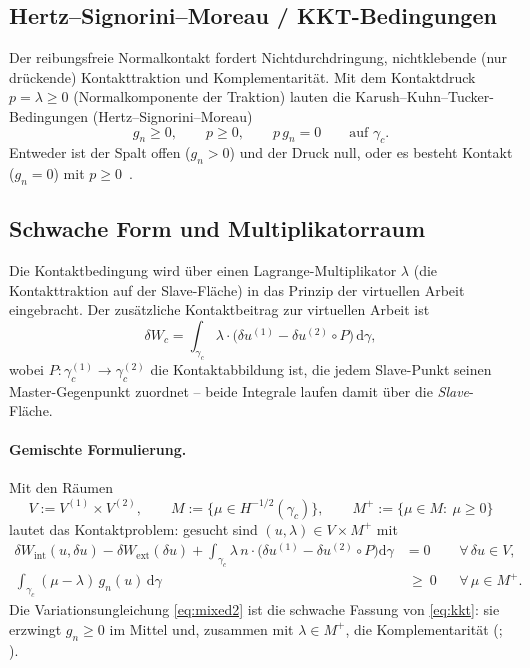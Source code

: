 \documentclass[a4paper,11pt]{article}
\def\bm#1{#1}%
\begin{document}
\subsection{Hertz--Signorini--Moreau / KKT-Bedingungen}
Der reibungsfreie Normalkontakt fordert Nichtdurchdringung, nichtklebende (nur drückende)
Kontakttraktion und Komplementarität. Mit dem Kontaktdruck $p=\lambda\ge0$ (Normalkomponente der
Traktion) lauten die Karush--Kuhn--Tucker-Bedingungen (Hertz--Signorini--Moreau)
\begin{equation}
g_n \ge 0, \qquad p \ge 0, \qquad p\, g_n = 0 \qquad \text{auf } \gamma_c .
\label{eq:kkt}
\end{equation}
Entweder ist der Spalt offen ($g_n>0$) und der Druck null, oder es besteht Kontakt ($g_n=0$) mit
$p\ge0$~\citep[Kap.~4]{wriggers}.

\subsection{Schwache Form und Multiplikatorraum}
\label{sec:schwacheform}
Die Kontaktbedingung wird über einen Lagrange-Multiplikator $\bm\lambda$ (die Kontakttraktion auf
der Slave-Fläche) in das Prinzip der virtuellen Arbeit eingebracht. Der zusätzliche
Kontaktbeitrag zur virtuellen Arbeit ist
\begin{equation}
\delta W_c = \int_{\gamma_c} \bm\lambda\cdot\big(\delta\bm u^{(1)} - \delta\bm u^{(2)}\!\circ P\big)\,
\mathrm d\gamma ,
\label{eq:dWc}
\end{equation}
wobei $P:\gamma_c^{(1)}\!\to\!\gamma_c^{(2)}$ die Kontaktabbildung ist, die jedem Slave-Punkt seinen
Master-Gegenpunkt zuordnet -- beide Integrale laufen damit über die \emph{Slave}-Fläche.

\paragraph{Gemischte Formulierung.} Mit den Räumen
\begin{equation}
\bm V := \bm V^{(1)}\times\bm V^{(2)},\qquad
M := \big\{\mu\in H^{-1/2}(\gamma_c)\big\},\qquad
M^+ := \{\mu\in M:\ \mu\ge0\}
\end{equation}
lautet das Kontaktproblem: gesucht sind $(\bm u,\lambda)\in\bm V\times M^+$ mit
\begin{align}
\delta W_{\text{int}}(\bm u,\delta\bm u) - \delta W_{\text{ext}}(\delta\bm u)
+ \int_{\gamma_c}\lambda\,\bm n\cdot\big(\delta\bm u^{(1)}-\delta\bm u^{(2)}\!\circ P\big)\mathrm d\gamma
&= 0 &&\forall\,\delta\bm u\in\bm V, \label{eq:mixed1}\\
\int_{\gamma_c} (\mu-\lambda)\,g_n(\bm u)\,\mathrm d\gamma &\ \ge\ 0 &&\forall\,\mu\in M^+ .
\label{eq:mixed2}
\end{align}
Die Variationsungleichung \eqref{eq:mixed2} ist die schwache Fassung von \eqref{eq:kkt}: sie
erzwingt $g_n\ge0$ im Mittel und, zusammen mit $\lambda\in M^+$, die Komplementarität
(\citealp[Kap.~4]{wriggers}; \citealp[Abschn.~2.2]{popp2012}).
\end{document}
